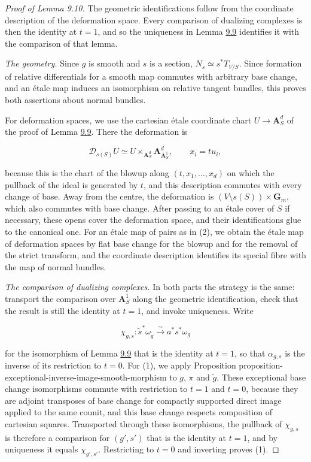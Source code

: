 \documentclass[11pt]{article}
\begin{document}
\begin{proof}[{Proof of Lemma 9.10}]\label{bp34}%
The geometric identifications follow from the coordinate description of the deformation space. Every comparison of dualizing complexes is then the identity at \(t=1\), and so the uniqueness in Lemma \hyperref[bp29]{9.9} identifies it with the comparison of that lemma.

\emph{The geometry.} Since \(g\) is smooth and \(s\) is a section, \(N_s\simeq s^*T_{V/S}\). Since formation of relative differentials for a smooth map commutes with arbitrary base change, and an étale map induces an isomorphism on relative tangent bundles, this proves both assertions about normal bundles.

For deformation spaces, we use the cartesian étale coordinate chart \(U\to\mathbf A^d_S\) of the proof of Lemma \hyperref[bp29]{9.9}. There the deformation is

\[
\mathcal D_{s(S)}U
\simeq U\times_{\mathbf A^d_S}\mathbf A^d_{\mathbf A^1_S},
\qquad x_i=t u_i,
\]

because this is the chart of the blowup along \((t,x_1,\ldots,x_d)\) on which the pullback of the ideal is generated by \(t\), and this description commutes with every change of base. Away from the centre, the deformation is \((V\setminus s(S))\times\mathbf G_m\), which also commutes with base change. After passing to an étale cover of \(S\) if necessary, these opens cover the deformation space, and their identifications glue to the canonical one. For an étale map of pairs as in (2), we obtain the étale map of deformation spaces by flat base change for the blowup and for the removal of the strict transform, and the coordinate description identifies its special fibre with the map of normal bundles.

\emph{The comparison of dualizing complexes.} In both parts the strategy is the same: transport the comparison over \(\mathbf A^1_S\) along the geometric identification, check that the result is still the identity at \(t=1\), and invoke uniqueness. Write

\[
\chi_{g,s}:\widetilde s^*\omega_{\widetilde g}\xrightarrow{\sim}a^*s^*\omega_g
\]

for the isomorphism of Lemma \hyperref[bp29]{9.9} that is the identity at \(t=1\), so that \(\alpha_{g,s}\) is the inverse of its restriction to \(t=0\). For (1), we apply Proposition proposition-exceptional-inverse-image-smooth-morphism to \(g\), \(\pi\) and \(\widetilde g\). These exceptional base change isomorphisms commute with restriction to \(t=1\) and \(t=0\), because they are adjoint transposes of base change for compactly supported direct image applied to the same counit, and this base change respects composition of cartesian squares. Transported through these isomorphisms, the pullback of \(\chi_{g,s}\) is therefore a comparison for \((g',s')\) that is the identity at \(t=1\), and by uniqueness it equals \(\chi_{g',s'}\). Restricting to \(t=0\) and inverting proves (1).


\end{proof}
\end{document}
